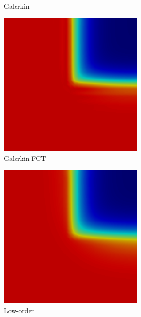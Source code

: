 \documentclass{beamer} \useoutertheme{infolines}
\begin{document}
\begin{frame}
\begin{figure}[h]
\begin{subfigure}{0.3\textwidth}
      \caption{Galerkin}
   \end{subfigure}
   \begin{subfigure}{0.3\textwidth}
      \includegraphics[width=0.8\textwidth]{./figures/skew_GalFCT.png}
      \caption{Galerkin-FCT}
   \end{subfigure}
   \begin{subfigure}{0.3\textwidth}
      \includegraphics[width=0.8\textwidth]{./figures/skew_low.png}
      \caption{Low-order}
   \end{subfigure}
   \begin{subfigure}{0.3\textwidth}

\end{subfigure}
\end{figure}
\end{frame}
\end{document}
